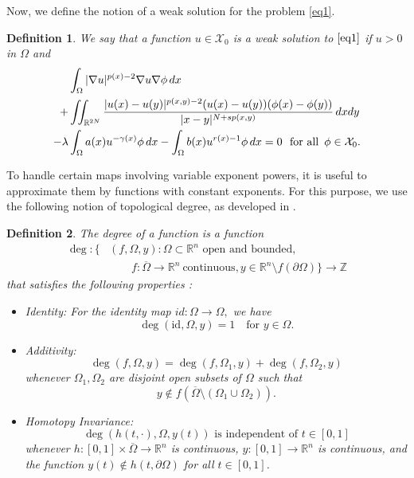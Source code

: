 \documentclass[11pt]{article}
\newtheorem{definition}{Definition}[section] %
\newcommand{\X}{\mathcal{X}_{0}}
\newcommand{\ga} {\gamma}
\newcommand{\om} {\Omega}
\newcommand{\la} {\lambda}
\newcommand{\na} {\nabla}
\newcommand{\grad}{\nabla}
\begin{document}
Now, we define the notion of a weak solution
 for the problem \eqref{eq1}.
 
\begin{definition}
    We say that a function $u\in \X$
is a weak solution to $\eqref{eq1}$
if $u>0$
in $\om$
and
\begin{align}\label{weak_sol}
&
\int_\om|\grad u|^{p(x)-2}\na u\na\phi\, dx  \\ \notag
  + 
& \iint_{\mathbb{R}^{2N}} 
\frac{|u(x)-u(y)|^{p(x,y)-2}(u(x)-u(y))
(\phi(x)-\phi(y))}{|x-y|^{N+sp(x,y)}}\,dxdy
  \\ \notag
 -\la 
 &
\int_\om a(x)u^{-\ga(x)}\phi\,dx -
\int_\om b(x)u^{r(x)-1}\phi\,dx=0
\  \text{ for all  $ \,\phi \in \X$.}
	\end{align}
 
\end{definition}

To handle certain maps involving variable 
exponent powers, it is useful to approximate 
them by functions with constant exponents.
For this purpose, we use the following notion 
of topological degree, as developed in
\cite{deimling_degree_theory}.

\begin{definition}\label{def:degree}
The degree of a function is a function 
\begin{align*}
\deg : \Big\{
& (f, \Omega, y) : 
\Omega \subset \mathbb{R}^n 
\text{ open and bounded}, \\
&  
\qquad
f : \overline{\Omega} 
\to \mathbb{R}^n\ \text{continuous}, y \in 
\mathbb{R}^n \setminus f(\partial \Omega) \Big\}
 \to \mathbb{Z}
\end{align*}
that satisfies the following properties :

\begin{itemize}

    
\item[$(d1)$] {Identity:} For the identity map 
$id: \Omega \to \Omega,$
we have
    \[
    \deg(\text{id}, \Omega, y) = 1 
  \quad \text{for } y \in \Omega.
    \]
    
\item[$(d2)$] {Additivity:}
    \[
    \deg(f, \Omega, y) = \deg(f, \Omega_1, y) 
 + \deg(f, \Omega_2, y)
    \]
    whenever $\Omega_1, \Omega_2$
are disjoint open subsets of $\Omega$
such that 
$$
y \notin f
\left (\overline{\Omega} \setminus 
(\Omega_1 \cup \Omega_2)
\right ). 
$$
    
\item[$(d3)$] {Homotopy Invariance:}
    \[
    \deg(h(t, \cdot), \Omega, y(t)) 
   \text{ is independent of } t \in  [0, 1]
    \]
    whenever 
$h : [0,1] \times \overline{\Omega} \to \mathbb{R}^n$
is continuous,
$y : [0,1] \to \mathbb{R}^n$
is continuous, and the function
$y(t) \notin h(t, \partial \Omega)$
for all $t \in [0,1]$.
\end{itemize}
\end{definition}
\end{document}

